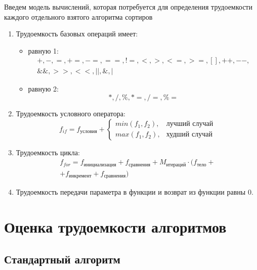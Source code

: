 Введем модель вычислений, которая потребуется для определения 
трудоемкости каждого отдельного взятого алгоритма сортиров
\begin{enumerate}[label={\arabic*)}]
	\item Трудоемкость базовых операций имеет:
	\begin{itemize}[label=---]
		\item равную 1:
		\begin{equation}
			\label{for:operations_1}
			\begin{gathered}
				+, -, =, +=, -=, ==, !=, <, >, <=, >=, [], ++, {-}-,\\
				\&\&, >>, <<, ||, \&, |
			\end{gathered}
		\end{equation}
		\item равную 2:
		\begin{equation}
			\label{for:operations_2}
			*, /, \%, *=, /=, \%=
		\end{equation}
	\end{itemize}
	\item Трудоемкость условного оператора:
	\begin{equation}
		\label{for:if}
		f_{if} = f_{\text{условия}} + 
		\begin{cases}
			min(f_1, f_2), & \text{лучший случай}\\
			max(f_1, f_2), & \text{худший случай}
		\end{cases}
	\end{equation}
	\item Трудоемкость цикла:
	\begin{equation}
		\label{for:for}
		\begin{gathered}
			f_{for} = f_{\text{инициализация}} + f_{\text{сравнения}} + M_{\text{итераций}} \cdot (f_{\text{тело}} +\\
			+ f_{\text{инкремент}} + f_{\text{сравнения}})
		\end{gathered}
	\end{equation}
	\item Трудоемкость передачи параметра в функции и возврат из функции равны 0.
\end{enumerate}

\clearpage

\section{Оценка трудоемкости алгоритмов}

\subsection{Стандартный алгоритм}

